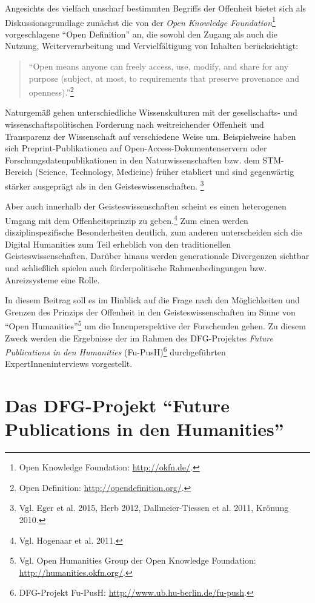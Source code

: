 \documentclass[a4paper,
fontsize=11pt,
oneside,
numbers=noperiodatend,
parskip=half-,
bibliography=totoc,
final
]{scrartcl}
\begin{document}
Angesichts des vielfach unscharf bestimmten Begriffs der Offenheit
bietet sich als Diskussionsgrundlage zunächst die von der \emph{Open
Knowledge Foundation}\footnote{Open Knowledge Foundation:
  \url{http://okfn.de/}.} vorgeschlagene \enquote{Open Definition} an,
die sowohl den Zugang als auch die Nutzung, Weiterverarbeitung und
Vervielfältigung von Inhalten berücksichtigt:

\begin{quote}
\enquote{Open means anyone can freely access, use, modify, and share for
any purpose (subject, at most, to requirements that preserve provenance
and openness).}\footnote{Open Definition:
  \url{http://opendefinition.org/}.}
\end{quote}

Naturgemäß gehen unterschiedliche Wissenskulturen mit der gesellschafts-
und wissenschaftspolitischen Forderung nach weitreichender Offenheit und
Transparenz der Wissenschaft auf verschiedene Weise um. Beispielweise
haben sich Preprint-Publikationen auf Open-Access-Doku\-mentenservern oder
Forschungsdatenpublikationen in den Naturwissenschaften bzw. dem
STM-Bereich (Science, Technology, Medicine) früher etabliert und sind
gegenwärtig stärker ausgeprägt als in den Geisteswissenschaften.
\footnote{Vgl. Eger et al. 2015, Herb 2012, Dallmeier-Tiessen et al.
  2011, Krönung 2010.}

Aber auch innerhalb der Geisteswissenschaften scheint es einen
heterogenen Umgang mit dem Offenheitsprinzip zu geben.\footnote{Vgl.
  Hogenaar et al. 2011.} Zum einen werden disziplinspezifische
Besonderheiten deutlich, zum anderen unterscheiden sich die Digital
Humanities zum Teil erheblich von den traditionellen
Geisteswissenschaften. Darüber hinaus werden generationale Divergenzen
sichtbar und schließlich spielen auch förderpolitische Rahmenbedingungen
bzw. Anreizsysteme eine Rolle.

In diesem Beitrag soll es im Hinblick auf die Frage nach den
Möglichkeiten und Grenzen des Prinzips der Offenheit in den
Geisteswissenschaften im Sinne von \enquote{Open Humanities}\footnote{Vgl.
  Open Humanities Group der Open Knowledge Foundation:
  \url{http://humanities.okfn.org/}.} um die Innenperspektive der
Forschenden gehen. Zu diesem Zweck werden die Ergebnisse der im Rahmen
des DFG-Projektes \emph{Future Publications in den Humanities}
(Fu-PusH)\footnote{DFG-Projekt Fu-PusH:
  \url{http://www.ub.hu-berlin.de/fu-push}.} durchgeführten
ExpertInneninterviews vorgestellt.

\section{\texorpdfstring{Das DFG-Projekt \enquote{Future Publications in
den
Humanities}}{Das DFG-Projekt Future Publications in den Humanities}}\label{das-dfg-projekt-future-publications-in-den-humanities}
\end{document}
